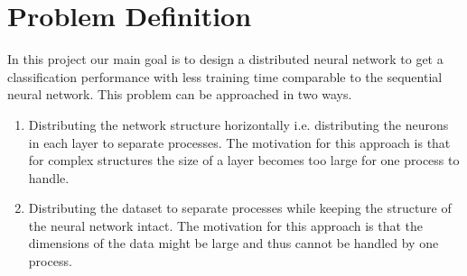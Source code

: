 \documentclass{sig-alternate-05-2015}
\begin{document}
\section{Problem Definition} \label{Problem Definition} 
In this project our main goal is to design a distributed neural network to get a classification performance with less training time comparable to the sequential neural network.
This problem can be approached in two ways. 
\begin{enumerate}
\item Distributing the network structure horizontally i.e. distributing the neurons in each layer to separate processes. The motivation for this approach is that for complex structures the size of a layer becomes too large for one process to handle.
\item Distributing the dataset to separate processes while keeping the structure of the neural network intact. The motivation for this approach is that the dimensions of the data might be large and thus cannot be handled by one process.
\end{enumerate}  
\end{document}
